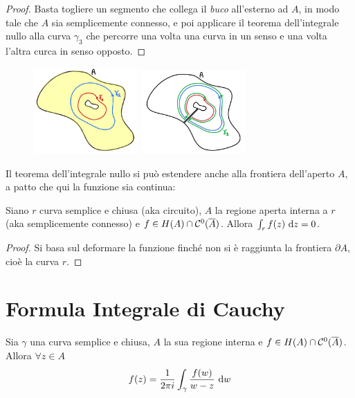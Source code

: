 \begin{proof}
Basta togliere un segmento che collega il \textit{buco} all'esterno ad $A$, in modo tale che $A$ sia semplicemente connesso, e poi applicare il teorema dell'integrale nullo alla curva $\gamma_3$ che percorre una volta una curva in un senso e una volta l'altra curca in senso opposto.
\end{proof}

\begin{figure}[h!]
\begin{center}
  \includegraphics[width=4cm]{images/bonfa_2}
  \includegraphics[width=4cm]{images/bonfa_3}
\end{center}
\end{figure}

Il teorema dell'integrale nullo si può estendere anche alla frontiera dell'aperto $A$, a patto che qui la funzione sia continua:
\begin{thm}
Siano $r$ curva semplice e chiusa (aka circuito), $A$ la regione aperta interna a $r$ (aka semplicemente connesso) e $f\in H(A)\cap\mathcal{C}^0(\overline{A})$. Allora $\int_r f(z)\  \mathrm{d} z=0$.
\end{thm}
\begin{proof}
Si basa sul deformare la funzione finché non si è raggiunta la frontiera $\partial A$, cioè la curva $r$.
\end{proof}

\section{Formula Integrale di Cauchy}

\begin{thm}
Sia $\gamma$ una curva semplice e chiusa, $A$ la sua regione interna e $f\in H(A) \cap \mathcal{C}^{0}(\overline{A})$. Allora $\forall z\in A$
\begin{equation*}
f(z) = \frac{1}{2\pi i}\int_{\gamma}\frac{f(w)}{w - z} \  \mathrm{d} w
\end{equation*}
\end{thm}


